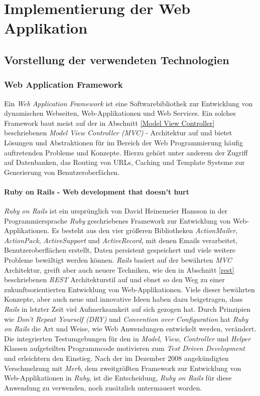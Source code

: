 \chapter{Implementierung der Web Applikation}

\section{Vorstellung der verwendeten Technologien}

\subsection{Web Application Framework}

Ein \textit{Web Application Framework} ist eine Softwarebibliothek zur
Entwicklung von dynamischen Webseiten, Web-Applikationen und Web
Services. Ein solches Framework baut meist auf der in Abschnitt
\ref{Model View Controller} beschriebenen \textit{Model View
  Controller (MVC)}  -
Architektur auf und bietet Lösungen und Abstraktionen für im Bereich
der Web Programmierung häufig auftretenden Probleme und
Konzepte. Hierzu gehört unter anderem der Zugriff auf Datenbanken, das
Routing von URLs, Caching und Template Systeme zur Generierung von
Benutzeroberfächen.

\subsubsection{Ruby on Rails - Web development that doesn't hurt}

\textit{Ruby on Rails} ist ein ursprünglich von David Heinemeier
Hansson in der Programmiersprache \textit{Ruby} geschriebenes
Framework zur Entwicklung von Web-Applikationen. Es besteht aus den
vier größeren Bibliotheken \textit{ActionMailer}, \textit{ActionPack},
\textit{ActiveSupport} und \textit{ActiveRecord}, mit denen Emails
verarbeitet, Benutzeroberflächen erstellt, Daten persistent
gespeichert und viele weitere Probleme bewältigt werden
können. \textit{Rails} basiert auf der bewährten \textit{MVC}
Architektur, greift aber auch neuere Techniken, wie den in Abschnitt
\ref{rest} beschriebenen \textit{REST}
 Architekturstil
auf und ebnet so den Weg zu einer zukunftsorientierten Entwicklung von
Web-Applikationen. Viele dieser bewährten Konzepte, aber auch neue und
innovative Ideen haben dazu beigetragen, dass \textit{Rails} in
letzter Zeit viel Aufmerksamkeit auf sich gezogen hat. Durch
Prinzipien wie \textit{Don't Repeat Yourself (DRY)}
 und \textit{Convention over
  Configuration} hat \textit{Ruby on Rails} die Art und Weise, wie Web
Anwendungen entwickelt werden, verändert. Die integrierten
Testumgebungen für den in \textit{Model}, \textit{View},
\textit{Controller} und \textit{Helper} Klassen aufgeteilten
Programmcode motivieren zum \textit{Test Driven Development} und
erleichtern den Einstieg.  Nach der im Dezember 2008 angekündigten
Verschmelzung mit \textit{Merb}, dem zweitgrößten Framework zur
Entwicklung von Web-Applikationen in \textit{Ruby}, ist die
Entscheidung, \textit{Ruby on Rails} für diese Anwendung zu verwenden,
noch zusätzlich untermauert worden.

